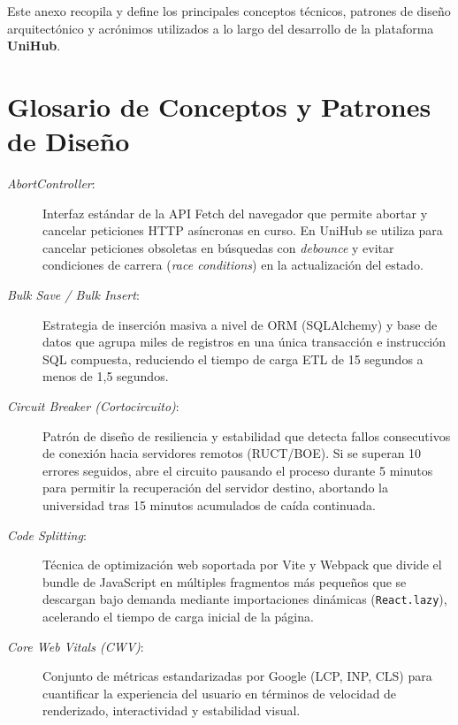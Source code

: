 
Este anexo recopila y define los principales conceptos técnicos, patrones de diseño arquitectónico y acrónimos utilizados a lo largo del desarrollo de la plataforma \textbf{UniHub}.

\section{Glosario de Conceptos y Patrones de Diseño}

\begin{description}
    \item[\textit{AbortController}:] Interfaz estándar de la API Fetch del navegador que permite abortar y cancelar peticiones HTTP asíncronas en curso. En UniHub se utiliza para cancelar peticiones obsoletas en búsquedas con \emph{debounce} y evitar condiciones de carrera (\emph{race conditions}) en la actualización del estado.

    \item[\textit{Bulk Save / Bulk Insert}:] Estrategia de inserción masiva a nivel de ORM (SQLAlchemy) y base de datos que agrupa miles de registros en una única transacción e instrucción SQL compuesta, reduciendo el tiempo de carga ETL de 15 segundos a menos de 1,5 segundos.

    \item[\textit{Circuit Breaker (Cortocircuito)}:] Patrón de diseño de resiliencia y estabilidad que detecta fallos consecutivos de conexión hacia servidores remotos (RUCT/BOE). Si se superan 10 errores seguidos, abre el circuito pausando el proceso durante 5 minutos para permitir la recuperación del servidor destino, abortando la universidad tras 15 minutos acumulados de caída continuada.

    \item[\textit{Code Splitting}:] Técnica de optimización web soportada por Vite y Webpack que divide el bundle de JavaScript en múltiples fragmentos más pequeños que se descargan bajo demanda mediante importaciones dinámicas (\texttt{React.lazy}), acelerando el tiempo de carga inicial de la página.

    \item[\textit{Core Web Vitals (CWV)}:] Conjunto de métricas estandarizadas por Google (LCP, INP, CLS) para cuantificar la experiencia del usuario en términos de velocidad de renderizado, interactividad y estabilidad visual.


\end{description}
